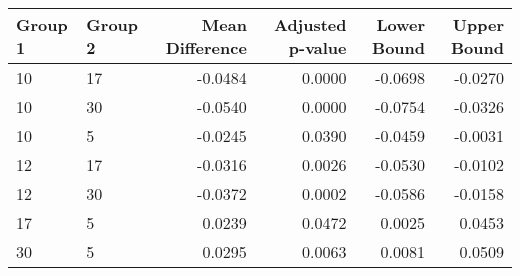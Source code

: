 \begin{tabular}{llrrrr}
\toprule
Group 1 & Group 2 & Mean Difference & Adjusted p-value & Lower Bound & Upper Bound \\
\midrule
10 & 17 & -0.0484 & 0.0000 & -0.0698 & -0.0270 \\
10 & 30 & -0.0540 & 0.0000 & -0.0754 & -0.0326 \\
10 & 5 & -0.0245 & 0.0390 & -0.0459 & -0.0031 \\
12 & 17 & -0.0316 & 0.0026 & -0.0530 & -0.0102 \\
12 & 30 & -0.0372 & 0.0002 & -0.0586 & -0.0158 \\
17 & 5 & 0.0239 & 0.0472 & 0.0025 & 0.0453 \\
30 & 5 & 0.0295 & 0.0063 & 0.0081 & 0.0509 \\
\bottomrule
\end{tabular}
